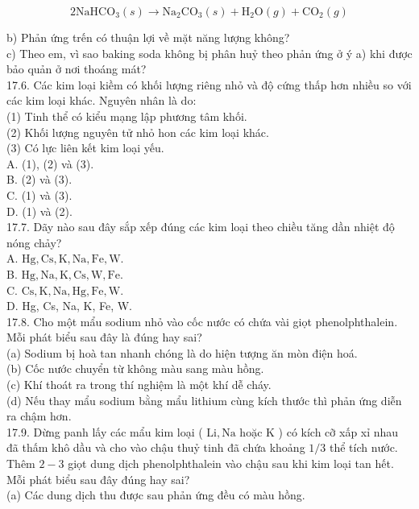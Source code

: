 \documentclass[10pt]{article}
\begin{document}
$$
2 \mathrm{NaHCO}_{3}(s) \rightarrow \mathrm{Na}_{2} \mathrm{CO}_{3}(s)+\mathrm{H}_{2} \mathrm{O}(g)+\mathrm{CO}_{2}(g)
$$

b) Phản ứng trến có thuận lợi về mặt năng lượng không?\\
c) Theo em, vì sao baking soda không bị phân huỷ theo phản ứng ở ý a) khi được bảo quản ở nơi thoáng mát?\\
17.6. Các kim loại kiềm có khối lượng riêng nhỏ và độ cứng thấp hơn nhiều so với các kim loại khác. Nguyên nhân là do:\\
(1) Tinh thể có kiểu mạng lập phương tâm khối.\\
(2) Khối lượng nguyên tử nhỏ hon các kim loại khác.\\
(3) Có lực liên kết kim loại yếu.\\
A. (1), (2) và (3).\\
B. (2) và (3).\\
C. (1) và (3).\\
D. (1) và (2).\\
17.7. Dãy nào sau đây sắp xếp đúng các kim loại theo chiều tăng dần nhiệt độ nóng chảy?\\
A. $\mathrm{Hg}, \mathrm{Cs}, \mathrm{K}, \mathrm{Na}, \mathrm{Fe}, \mathrm{W}$.\\
B. $\mathrm{Hg}, \mathrm{Na}, \mathrm{K}, \mathrm{Cs}, \mathrm{W}, \mathrm{Fe}$.\\
C. $\mathrm{Cs}, \mathrm{K}, \mathrm{Na}, \mathrm{Hg}, \mathrm{Fe}, \mathrm{W}$.\\
D. Hg, Cs, Na, K, Fe, W.\\
17.8. Cho một mẩu sodium nhỏ vào cốc nước có chứa vài giọt phenolphthalein. Mỗi phát biểu sau đây là đúng hay sai?\\
(a) Sodium bị hoà tan nhanh chóng là do hiện tượng ăn mòn điện hoá.\\
(b) Cốc nước chuyển từ không màu sang màu hồng.\\
(c) Khí thoát ra trong thí nghiệm là một khí dễ cháy.\\
(d) Nếu thay mẩu sodium bằng mẩu lithium cùng kích thước thì phản ứng diễn ra chậm hơn.\\
17.9. Dừng panh lấy các mẩu kim loại ( $\mathrm{Li}, \mathrm{Na}$ hoặc K ) có kích cỡ xấp xỉ nhau đã thấm khô dầu và cho vào chậu thuỷ tinh đã chứa khoảng $1 / 3$ thể tích nước. Thêm $2-3$ giọt dung dịch phenolphthalein vào chậu sau khi kim loại tan hết. Mỗi phát biểu sau đây đúng hay sai?\\
(a) Các dung dịch thu được sau phản ứng đều có màu hồng.\\
\end{document}
